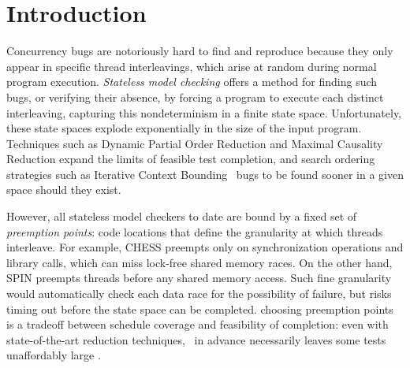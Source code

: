 \section{Introduction}

Concurrency bugs are notoriously hard to find and reproduce because they only appear in specific thread interleavings, which arise at random during normal program execution.
{\em Stateless model checking} \cite{verisoft} offers a method for finding such bugs,
or verifying their absence,
by forcing a program to execute each distinct interleaving,
capturing
this nondeterminism in a finite state space.
Unfortunately, these state spaces explode exponentially in the size of the input program.
Techniques such as Dynamic Partial Order Reduction \cite{dpor} and Maximal Causality Reduction \cite{mcr} expand the limits of feasible test completion,
and search ordering strategies such as Iterative Context Bounding \cite{chess-icb} ~bugs to be found sooner in a given space should they exist.

However, all stateless model checkers to date are bound by a fixed set of {\em preemption points}: code locations that define the granularity at which threads interleave.
For example, \textsc{CHESS} \cite{chess}  preempts only on synchronization operations and library calls, which can miss lock-free shared memory races.
%
On the other hand, SPIN \cite{spin} %
preempts threads before any shared memory access.
Such fine granularity would automatically check each data race for the possibility of failure, but risks timing out before the state space can be completed. %
choosing preemption points is a tradeoff between schedule coverage and feasibility of completion:
even with state-of-the-art reduction techniques,
~in advance necessarily leaves some tests unaffordably large \cite{parrot,mcr}.

